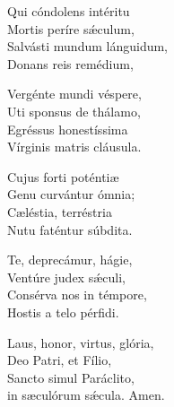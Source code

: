  Qui cóndolens intéritu\\ 
    Mortis períre sǽculum,\\  
    Salvásti mundum lánguidum,\\  
    Donans reis remédium, 

 Vergénte mundi véspere,\\  
    Uti sponsus de thálamo,\\  
    Egréssus honestíssima\\  
    Vírginis matris cláusula. 

 Cujus forti pot\-éntiæ\\  
    Genu curvántur ó\-mnia;\\  
    Cæléstia, terréstria\\  
     Nutu faténtur súbdita. 

 Te, deprecámur, hágie,\\  
    Ventúre judex sǽculi,\\  
    Consérva nos in témpore,\\  
    Hostis a telo pérfidi. 

 Laus, honor, virtus, glória,\\  
    Deo Patri, et Fílio,\\  
    Sancto simul Paráclito,\\  
    in sæculórum sǽcula. 
Amen.